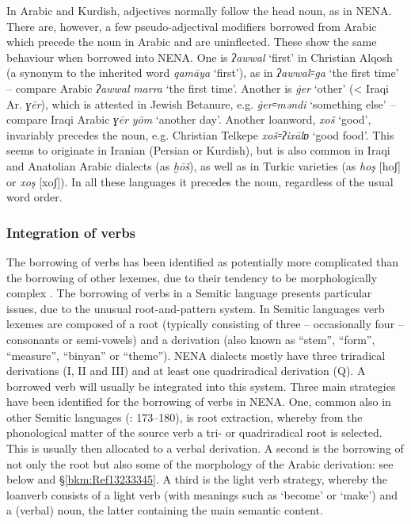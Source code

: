 \documentclass[output=paper]{langsci/langscibook}
\begin{document}
In Arabic and Kurdish, adjectives normally follow the head noun, as in NENA. There are, however, a few pseudo-adjectival modifiers borrowed from Arabic which precede the noun in Arabic and are uninflected. These show the same behaviour when borrowed into NENA. One is \textit{ʔawwal} ‘first’ in Christian Alqosh (a synonym to the inherited word \textit{qamāya} ‘first’), as in \textit{ʔawwal꞊ga} ‘the first time’ – compare Arabic \textit{ʔawwal} \textit{marra} ‘the first time’. Another is \textit{\.ger} ‘other’ (< Iraqi Ar. \textit{ɣēr}), which is attested in Jewish Betanure, e.g. \textit{\.ger꞊məndi} ‘something else’ \citep[105]{Mutzafi2008} – compare Iraqi Arabic \textit{ɣēr} \textit{yōm} ‘another day’. Another loanword, \textit{xoš} ‘good’, invariably precedes the noun, e.g. Christian Telkepe \textit{xoš꞊ʔixālɒ} ‘good food’. This seems to originate in Iranian (Persian or Kurdish), but is also common in Iraqi and Anatolian Arabic dialects (as \textit{ḫōš}), as well as in Turkic varieties (as \textit{hoş} [hoʃ] or \textit{xoş} [xoʃ]). In all these languages it precedes the noun, regardless of the usual word order.

\subsubsection{\label{bkm:Ref13233110}Integration of verbs}

The borrowing of verbs has been identified as potentially more complicated than the borrowing of other lexemes, due to their tendency to be morphologically complex \citep[175]{Matras2009}. The borrowing of verbs in a Semitic language presents particular issues, due to the unusual root-and-pattern system. In Semitic languages verb lexemes are composed of a root (typically consisting of three – occasionally four – consonants or semi-vowels) and a derivation (also known as ``stem'', ``form'', ``measure'', ``binyan'' or ``theme''). NENA dialects mostly have three triradical derivations (I, II and III) and at least one quadriradical derivation (Q). A borrowed verb will usually be integrated into this system. Three main strategies have been identified for the borrowing of verbs in NENA. One, common also in other Semitic languages (\citealt{Wohlgemuth2009}: 173–180), is root extraction, whereby from the phonological matter of the source verb a tri- or quadriradical root is selected. This is usually then allocated to a verbal derivation. A second is the borrowing of not only the root but also some of the morphology of the Arabic derivation: see below and §\ref{bkm:Ref13233345}. A third is the light verb strategy, whereby the loanverb consists of a light verb (with meanings such as `become' or `make') and a (verbal) noun, the latter containing the main semantic content. 
\end{document}
